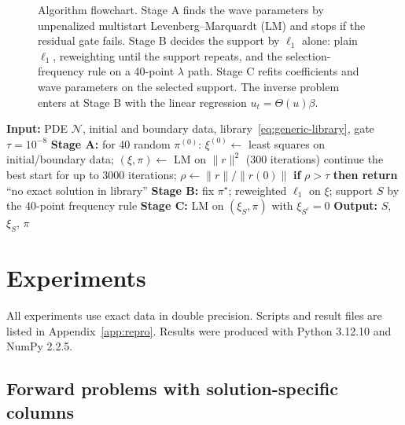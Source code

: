 \documentclass{article}
\begin{document}
\begin{figure}[t]
\centering
\resizebox{\linewidth}{!}{}
\caption{Algorithm flowchart. Stage A finds the wave parameters by unpenalized multistart Levenberg--Marquardt (LM) and stops if the residual gate fails. Stage B decides the support by $\ell_1$ alone: plain $\ell_1$, reweighting until the support repeats, and the selection-frequency rule on a 40-point $\lambda$ path. Stage C refits coefficients and wave parameters on the selected support. The inverse problem enters at Stage B with the linear regression $u_t = \Theta(u)\beta$.}
\label{fig:flowchart}
\end{figure}

\begin{algorithm}[t]
\caption{Generic-library forward selection}
\label{alg:generic}
\begin{algorithmic}
\STATE \textbf{Input:} PDE $\mathcal{N}$, initial and boundary data, library~\eqref{eq:generic-library}, gate $\tau = 10^{-8}$
\STATE \textbf{Stage A:} for 40 random $\pi^{(0)}$: $\xi^{(0)} \leftarrow$ least squares on initial/boundary data; $(\xi,\pi) \leftarrow$ LM on $\|r\|^2$ (300 iterations)
\STATE \quad continue the best start for up to 3000 iterations; $\rho \leftarrow \|r\|/\|r(0)\|$
\STATE \textbf{if} $\rho > \tau$ \textbf{then return} ``no exact solution in library''
\STATE \textbf{Stage B:} fix $\pi^\star$; reweighted $\ell_1$ on $\xi$; support $S$ by the 40-point frequency rule
\STATE \textbf{Stage C:} LM on $(\xi_S, \pi)$ with $\xi_{S^c} = 0$
\STATE \textbf{Output:} $S$, $\xi_S$, $\pi$
\end{algorithmic}
\end{algorithm}

\section{Experiments}
\label{sec:experiments}

All experiments use exact data in double precision. Scripts and result files are listed in Appendix~\ref{app:repro}. Results were produced with Python 3.12.10 and NumPy 2.2.5.

\subsection{Forward problems with solution-specific columns}
\label{sec:forward-discrete}
\end{document}
